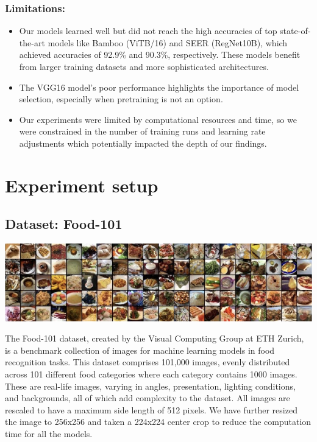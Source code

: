 \documentclass{article}
\begin{document}
\subsubsection{Limitations:}
\begin{itemize}
    \item Our models learned well but did not reach the high accuracies of top state-of-the-art models like Bamboo (ViTB/16) and SEER (RegNet10B), which achieved accuracies of 92.9\% and 90.3\%, respectively. These models benefit from larger training datasets and more sophisticated architectures.
    \item The VGG16 model’s poor performance highlights the importance of model selection, especially when pretraining is not an option.
    \item Our experiments were limited by computational resources and time, so we were constrained in the number of training runs and learning rate adjustments which potentially impacted the depth of our findings.
\end{itemize}


\section{Experiment setup}

\subsection{Dataset: Food-101}

\begin{center}
    \includegraphics[width=1\linewidth]{images/food101dataset-image.png}
\end{center}

The Food-101 dataset, created by the Visual Computing Group at ETH Zurich, is a benchmark collection of images for machine learning models in food recognition tasks. This dataset comprises 101,000 images, evenly distributed across 101 different food categories where each category contains 1000 images. These are real-life images, varying in angles, presentation, lighting conditions, and backgrounds, all of which add complexity to the dataset. All images are rescaled to have a maximum side length of 512 pixels. We have further resized the image to 256x256 and taken a 224x224 center crop to reduce the computation time for all the models.
\end{document}
